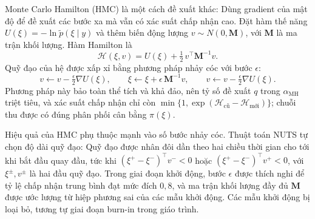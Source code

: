 \documentclass[12pt,a4paper]{article}
\theoremstyle{definition}
\theoremstyle{remark}
\newcommand{\Ncal}{N}
\begin{document}
Monte Carlo Hamilton (HMC) là một cách đề xuất khác: Dùng gradient của mật độ để đề xuất các bước xa mà vẫn có xác suất chấp nhận cao. Đặt hàm thế năng $U(\xi)=-\ln\tilde p(\xi\mid y)$ và thêm biến động lượng $v\sim\Ncal(0,\mathbf M)$, với $\mathbf M$ là ma trận khối lượng. Hàm Hamilton là
\begin{equation}
\mathcal H(\xi,v)=U(\xi)+\tfrac12\,v^\top\mathbf M^{-1}v .
\end{equation}
Quỹ đạo của hệ được xấp xỉ bằng phương pháp nhảy cóc với bước $\epsilon$:
\begin{equation}
v\leftarrow v-\tfrac{\epsilon}{2}\nabla U(\xi),\qquad \xi\leftarrow\xi+\epsilon\,\mathbf M^{-1}v,\qquad v\leftarrow v-\tfrac{\epsilon}{2}\nabla U(\xi).
\end{equation}
Phương pháp này bảo toàn thể tích và khả đảo, nên tỷ số đề xuất $q$ trong $\alpha_{\mathrm{MH}}$ triệt tiêu, và xác suất chấp nhận chỉ còn $\min\{1,\exp(\mathcal H_{\text{cũ}}-\mathcal H_{\text{mới}})\}$; chuỗi thu được có đúng phân phối cân bằng $\pi(\xi)$.

Hiệu quả của HMC phụ thuộc mạnh vào số bước nhảy cóc. Thuật toán NUTS \cite{hoffman2014} tự chọn độ dài quỹ đạo: Quỹ đạo được nhân đôi dần theo hai chiều thời gian cho tới khi bắt đầu quay đầu, tức khi $(\xi^{+}-\xi^{-})^\top v^{-}<0$ hoặc $(\xi^{+}-\xi^{-})^\top v^{+}<0$, với $\xi^{\pm},v^{\pm}$ là hai đầu quỹ đạo. Trong giai đoạn khởi động, bước $\epsilon$ được thích nghi để tỷ lệ chấp nhận trung bình đạt mức đích $0{,}8$, và ma trận khối lượng đầy đủ $\mathbf M$ được ước lượng từ hiệp phương sai của các mẫu khởi động. Các mẫu khởi động bị loại bỏ, tương tự giai đoạn burn-in trong giáo trình.
\end{document}
